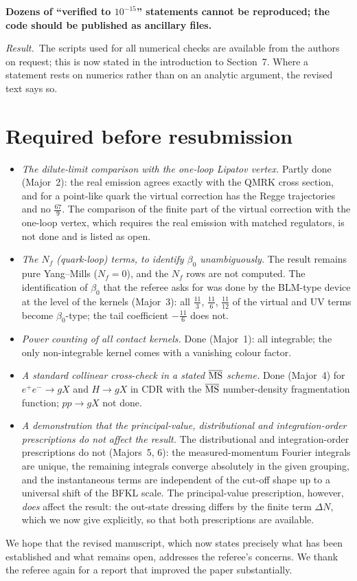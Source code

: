 \documentclass[a4paper,11pt]{article}
\newcommand{\MS}{\overline{\rm MS}}
\newcommand{\point}[1]{\par\medskip\noindent\textbf{#1}\par}
\newcommand{\result}{\par\noindent\emph{Result.}\ }
\begin{document}
\point{Dozens of ``verified to $10^{-15}$'' statements cannot be reproduced; the code should be published as ancillary files.}
\result The scripts used for all numerical checks are available from the authors on request; this is now stated in the introduction to Section~7. Where a statement rests on numerics rather than on an analytic argument, the revised text says so.

\section*{Required before resubmission}
\begin{itemize}[leftmargin=1.5em]
\item \emph{The dilute-limit comparison with the one-loop Lipatov vertex.} Partly done (Major~2): the real emission agrees exactly with the QMRK cross section, and for a point-like quark the virtual correction has the Regge trajectories and no $\frac{67}{9}$. The comparison of the finite part of the virtual correction with the one-loop vertex, which requires the real emission with matched regulators, is not done and is listed as open.
\item \emph{The $N_f$ (quark-loop) terms, to identify $\beta_0$ unambiguously.} The result remains pure Yang--Mills ($N_f=0$), and the $N_f$ rows are not computed. The identification of $\beta_0$ that the referee asks for was done by the BLM-type device at the level of the kernels (Major~3): all $\frac{11}{3}$, $\frac{11}{6}$, $\frac{11}{12}$ of the virtual and UV terms become $\beta_0$-type; the tail coefficient $-\frac{11}{6}$ does not.
\item \emph{Power counting of all contact kernels.} Done (Major~1): all integrable; the only non-integrable kernel comes with a vanishing colour factor.
\item \emph{A standard collinear cross-check in a stated $\MS$ scheme.} Done (Major~4) for $e^+e^-\to gX$ and $H\to gX$ in CDR with the $\MS$ number-density fragmentation function; $pp\to gX$ not done.
\item \emph{A demonstration that the principal-value, distributional and integration-order prescriptions do not affect the result.} The distributional and integration-order prescriptions do not (Majors~5, 6): the measured-momentum Fourier integrals are unique, the remaining integrals converge absolutely in the given grouping, and the instantaneous terms are independent of the cut-off shape up to a universal shift of the BFKL scale. The principal-value prescription, however, \emph{does} affect the result: the out-state dressing differs by the finite term $\Delta N$, which we now give explicitly, so that both prescriptions are available.
\end{itemize}

We hope that the revised manuscript, which now states precisely what has been established and what remains open, addresses the referee's concerns. We thank the referee again for a report that improved the paper substantially.
\end{document}
